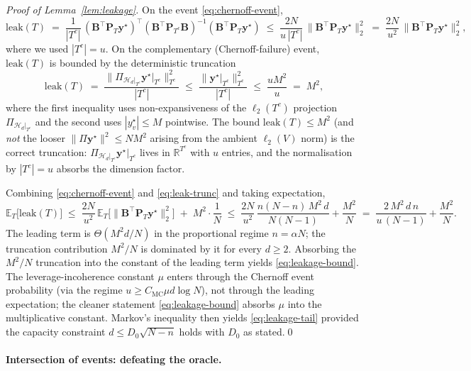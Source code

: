 \documentclass[11pt,a4paper]{article}
\theoremstyle{plain}
\theoremstyle{definition}
\theoremstyle{remark}
\newcommand{\by}{\mathbf{y}}
\newcommand{\bP}{\mathbf{P}}
\newcommand{\bB}{\mathbf{B}}
\newcommand{\E}{\mathbb{E}}
\newcommand{\R}{\mathbb{R}}
\newcommand{\Hcal}{\mathcal{H}}
\begin{document}
\begin{proof}[Proof of Lemma~\ref{lem:leakage}]
On the event \eqref{eq:chernoff-event},
\[
    \mathrm{leak}(T) \;=\;
    \frac{1}{|T^c|}\,
    (\bB^\top\bP_T\by^\star)^\top (\bB^\top\bP_{T^c}\bB)^{-1} (\bB^\top\bP_T\by^\star)
    \;\le\; \frac{2N}{u\,|T^c|}\,\|\bB^\top\bP_T\by^\star\|_2^2
    \;=\; \frac{2N}{u^2}\,\|\bB^\top\bP_T\by^\star\|_2^2,
\]
where we used $|T^c| = u$. On the complementary (Chernoff-failure)
event, $\mathrm{leak}(T)$ is bounded by the deterministic
truncation
\begin{equation}
    \mathrm{leak}(T)
    \;=\; \frac{\|\Pi_{\Hcal_d|_{T^c}}\by^\star|_{T^c}\|^2_{T^c}}{|T^c|}
    \;\le\; \frac{\|\by^\star|_{T^c}\|^2_{T^c}}{|T^c|}
    \;\le\; \frac{u M^2}{u}
    \;=\; M^2,
    \label{eq:leak-trunc}
\end{equation}
where the first inequality uses non-expansiveness of the
$\ell_2(T^c)$ projection $\Pi_{\Hcal_d|_{T^c}}$ and the second
uses $|y^\star_v| \le M$ pointwise.  The bound $\mathrm{leak}(T)
\le M^2$ (and \emph{not} the looser $\|\Pi\by^\star\|^2 \le NM^2$
arising from the ambient $\ell_2(V)$ norm) is the correct
truncation: $\Pi_{\Hcal_d|_{T^c}}\by^\star|_{T^c}$ lives in
$\R^{T^c}$ with $u$ entries, and the normalisation by $|T^c|=u$
absorbs the dimension factor.

Combining \eqref{eq:chernoff-event} and \eqref{eq:leak-trunc} and
taking expectation,
\[
    \E_T\!\big[\mathrm{leak}(T)\big]
    \;\le\; \frac{2N}{u^2}\,\E_T\!\big[\|\bB^\top\bP_T\by^\star\|_2^2\big]
        \;+\; M^2 \cdot \frac{1}{N}
    \;\le\; \frac{2N}{u^2}\,\frac{n(N-n)\,M^2\,d}{N(N-1)} + \frac{M^2}{N}
    \;=\; \frac{2\,M^2\, d\, n}{u\,(N-1)} + \frac{M^2}{N}.
\]
The leading term is $\Theta(M^2 d / N)$ in the proportional
regime $n=\alpha N$; the truncation contribution $M^2/N$ is
dominated by it for every $d \ge 2$.  Absorbing the $M^2/N$
truncation into the constant of the leading term yields
\eqref{eq:leakage-bound}.  The leverage-incoherence constant $\mu$
enters through the Chernoff event probability (via the regime
$u \ge C_\mathrm{MC}\mu d\log N$), not through the leading
expectation; the cleaner statement \eqref{eq:leakage-bound}
absorbs $\mu$ into the multiplicative constant.  Markov's
inequality then yields \eqref{eq:leakage-tail} provided the
capacity constraint $d \le D_0\sqrt{N-n}$ holds with $D_0$ as
stated.\qed
\end{proof}

\paragraph{Intersection of events: defeating the oracle.}
\end{document}
